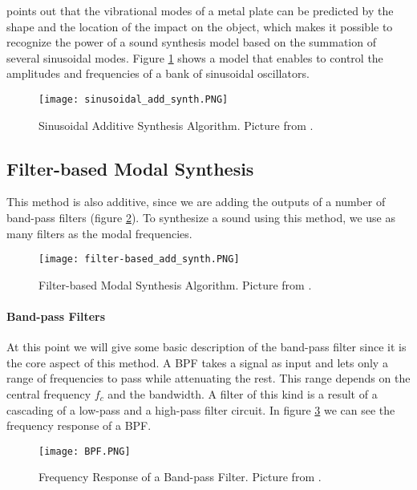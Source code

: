 \cite{Cook:2002:RSS:515316} points out that the vibrational modes of a  metal plate can be predicted by the shape and the location of the impact on the object, which makes it possible to recognize the power of a sound synthesis model based on the summation of several sinusoidal modes. Figure \ref{fig:sin_add_synth} shows a model that enables to control the amplitudes and frequencies of a bank of sinusoidal oscillators.

\begin{figure}[H]
  \centering
    \texttt{[image: sinusoidal\_add\_synth.PNG]}
      \caption{Sinusoidal Additive Synthesis Algorithm. Picture from \cite{Cook:2002:RSS:515316}.}
      \label{fig:sin_add_synth}
\end{figure}

\subsection{Filter-based Modal Synthesis}\label{sec:add_synth}

This method is also additive, since we are adding the outputs of a number of band-pass filters (figure \ref{fig:filter_synth}). To synthesize a sound using this method, we use as many filters as the modal frequencies.

\begin{figure}[H]
  \centering
    \texttt{[image: filter-based\_add\_synth.PNG]}
      \caption{Filter-based Modal Synthesis Algorithm. Picture from \cite{Cook:2002:RSS:515316}.}
      \label{fig:filter_synth}
\end{figure}

\paragraph{Band-pass Filters}\label{par:bpf}
\hfill \break

At this point we will give some basic description of the band-pass filter since it is the core aspect of this method. A \gls{BPF} takes a signal as input and lets only a range of frequencies to pass while attenuating the rest. This range depends on the central frequency $f_c$ and the bandwidth. A filter of this kind is a result of a cascading of a low-pass and a high-pass filter circuit.
In figure \ref{fig:resp_bpf} we can see the frequency response of a \gls{BPF}. 

\begin{figure}[H]
  \centering
    \texttt{[image: BPF.PNG]}
      \caption{Frequency Response of a Band-pass Filter. Picture from \cite{bib:bpf}.}
      \label{fig:resp_bpf}
\end{figure}

